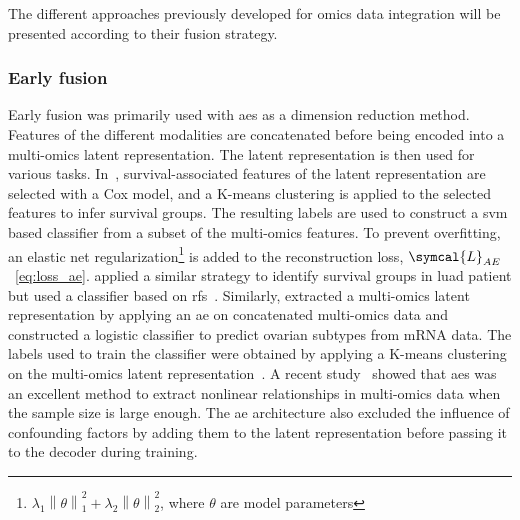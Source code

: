 \documentclass[../main.tex]{subfiles}
\begin{document}
		The different approaches previously developed for omics data integration will be presented according to their fusion strategy.

		\subsubsection{Early fusion}
			Early fusion was primarily used with \glspl{ae} as a dimension reduction method.
			Features of the different modalities are concatenated before being encoded into a multi-omics latent representation.
			The latent representation is then used for various tasks.
			In~\cite{Chaudhary2018}, survival-associated features of the latent representation are selected with a Cox model, and a K-means clustering is applied to the selected features to infer survival groups.
			The resulting labels are used to construct a \gls{svm} based classifier from a subset of the multi-omics features.
			To prevent overfitting, an elastic net regularization\footnote{\(\lambda_{1} \left\|\theta\right\|_{1}^{2} + \lambda_{2} \left\|\theta\right\|_{2}^{2}\), where \(\theta\) are model parameters} is added to the reconstruction loss, \(\symcal{L}_{AE}\)~\cref{eq:loss_ae}.
			\citeauthor{Lee2020} applied a similar strategy to identify survival groups in \gls{luad} patient but used a classifier based on \glspl{rf}~\cite{Lee2020}.
			Similarly, \citeauthor{Guo2020} extracted a multi-omics latent representation by applying an \gls{ae} on concatenated multi-omics data and constructed a logistic classifier to predict ovarian subtypes from mRNA data.
			The labels used to train the classifier were obtained by applying a K-means clustering on the multi-omics latent representation~\cite{Guo2020}.
			A recent study~\cite{Yu2022} showed that \glspl{ae} was an excellent method to extract nonlinear relationships in multi-omics data when the sample size is large enough.
			The \gls{ae} architecture also excluded the influence of confounding factors by adding them to the latent representation before passing it to the decoder during training.
\end{document}
